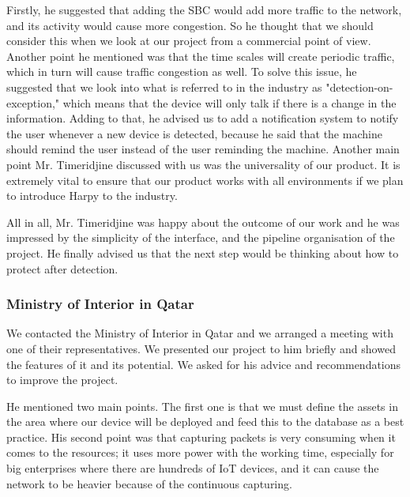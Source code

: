 \documentclass{article}
\begin{document}
Firstly, he suggested that adding the SBC would add more traffic to the network, and its activity would cause more congestion. So he thought that we should consider this when we look at our project from a commercial point of view. Another point he mentioned was that the time scales will create periodic traffic, which in turn will cause traffic congestion as well. To solve this issue, he suggested that we look into what is referred to in the industry as "detection-on-exception," which means that the device will only talk if there is a change in the information. Adding to that, he advised us to add a notification system to notify the user whenever a new device is detected, because he said that the machine should remind the user instead of the user reminding the machine. Another main point Mr. Timeridjine discussed with us was the universality of our product. It is extremely vital to ensure that our product works with all environments if we plan to introduce Harpy to the industry. \newline

All in all, Mr. Timeridjine was happy about the outcome of our work and he was impressed by the simplicity of the interface, and the pipeline organisation of the project. He finally advised us that the next step would be thinking about how to protect after detection. 

\subsubsection{Ministry of Interior in Qatar}
We contacted the Ministry of Interior in Qatar and we arranged a meeting with one of their representatives. We presented our project to him briefly and showed the features of it and its potential. We asked for his advice and recommendations to improve the project.\newline

He mentioned two main points. The first one is that we must define the assets in the area where our device will be deployed and feed this to the database as a best practice. His second point was that capturing packets is very consuming when it comes to the resources; it uses more power with the working time, especially for big enterprises where there are hundreds of IoT devices, and it can cause the network to be heavier because of the continuous capturing.
\end{document}
